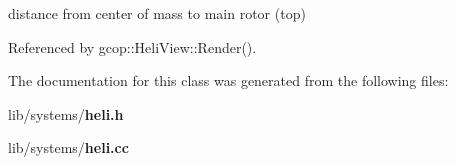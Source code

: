 distance from center of mass to main rotor (top) 



\-Referenced by gcop\-::\-Heli\-View\-::\-Render().



\-The documentation for this class was generated from the following files\-:\begin{DoxyCompactItemize}
\item 
lib/systems/{\bf heli.\-h}\item 
lib/systems/{\bf heli.\-cc}\end{DoxyCompactItemize}
